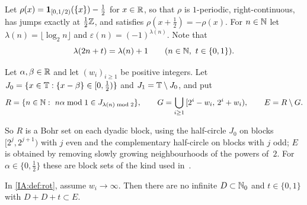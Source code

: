Let $\rho(x)=\mathbf{1}_{[0,1/2)}(\{x\})-\frac12$ for $x\in\mathbb{R}$, so that $\rho$ is $1$-periodic,
right-continuous, has jumps exactly at $\frac12\mathbb{Z}$, and satisfies $\rho(x+\frac12)=-\rho(x)$. For
$n\in\mathbb{N}$ let $\lambda(n)=\lfloor\log_2n\rfloor$ and $\varepsilon(n)=(-1)^{\lambda(n)}$. Note that
\begin{equation}\label{IA:eq:lambda}
\lambda(2n+t)=\lambda(n)+1\qquad(n\in\mathbb{N},\ t\in\{0,1\}).
\end{equation}

\begin{definition}\label{IA:def:rot}
Let $\alpha,\beta\in\mathbb{R}$ and let $(w_i)_{i\ge1}$ be positive integers. Let
$J_0=\{x\in\mathbb{T}:\{x-\beta\}\in[0,\tfrac12)\}$ and $J_1=\mathbb{T}\setminus J_0$, and put
\[
R=\{n\in\mathbb{N}:\ n\alpha\bmod 1\in J_{\lambda(n)\bmod 2}\},\qquad
G=\bigcup_{i\ge1}\,[2^i-w_i,\,2^i+w_i),\qquad E=R\setminus G .
\]
\end{definition}

So $R$ is a Bohr set on each dyadic block, using the half-circle $J_0$ on blocks
$[2^j,2^{j+1})$ with $j$ even and the complementary half-circle on blocks with $j$ odd; $E$ is
obtained by removing slowly growing neighbourhoods of the powers of~$2$. For $\alpha\in\{0,\frac12\}$
these are block sets of the kind used in~\cite[Section~4]{kousek2024infinite}.

\begin{proposition}\label{IA:prop:rot}
In \cref{IA:def:rot}, assume $w_i\to\infty$. Then there are no infinite $D\subset\mathbb{N}_0$ and
$t\in\{0,1\}$ with $D+D+t\subset E$.
\end{proposition}

